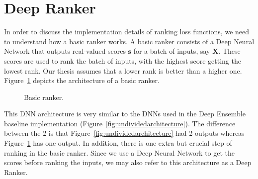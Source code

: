 \documentclass[12pt, twoside, ngerman]{report}
\begin{document}
\section{Deep Ranker}
\label{sec:BasicScoringModelDNN}

In order to discuss the implementation details of ranking loss functions,  we need to understand how a basic ranker works.
A basic ranker consists of a Deep Neural Network that outputs real-valued scores $\textbf{s}$ for a batch of inputs, say $\textbf{X}$.
These scores are used to rank the batch of inputs, with the highest score getting the lowest rank.
Our thesis assumes that a lower rank is better than a higher one.
Figure~\ref{fig:basicScoringModel} depicts the architecture of a basic ranker.

\begin{figure}[htb]
\centering
{}
\caption{Basic ranker.}
\label{fig:basicScoringModel}
\end{figure}

This DNN architecture is very similar to the DNNs used in the Deep Ensemble baseline implementation (Figure~\ref{fig:undividedarchitecture}).
The difference between the 2 is that Figure~\ref{fig:undividedarchitecture} had 2 outputs whereas Figure~\ref{fig:basicScoringModel} has one output.
In addition, there is one extra but crucial step of ranking in the basic ranker.
Since we use a Deep Neural Network to get the scores before ranking the inputs,  we may also refer to this architecture as a Deep Ranker.
\end{document}
